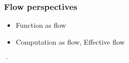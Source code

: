 \documentclass[aspectratio=169]{beamer}
\begin{document}
\begin{frame}[fragile]
    \frametitle{Flow perspectives}
    \begin{itemize}
        \item Function as flow
        \item Computation as flow, Effective flow
    \end{itemize}·
    \begin{columns}
        \begin{column}{0.5\textwidth}
            \begin{center}
            \end{center}
        \end{column}
        \begin{column}{0.5\textwidth}
            \begin{figure}[ht]\centering
            \end{figure}
        \end{column}
    \end{columns}
\end{frame}
\end{document}
